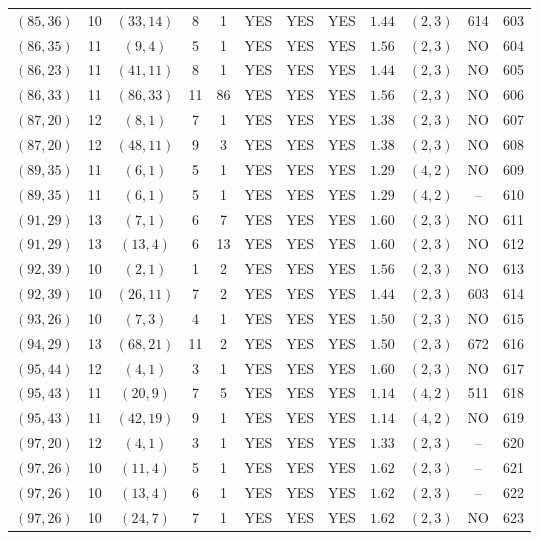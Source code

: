 \begin{longtable}{|c|c|c|c|c|c|c|c|c|c|c|c|}
$(85,36)$ & 10 & $(33,14)$ & 8 & 1 & YES & YES & YES & $1.44$ & $(2,3)$ & 614 & 603\\
$(86,35)$ & 11 & $(9,4)$ & 5 & 1 & YES & YES & YES & $1.56$ & $(2,3)$ & NO & 604\\
$(86,23)$ & 11 & $(41,11)$ & 8 & 1 & YES & YES & YES & $1.44$ & $(2,3)$ & NO & 605\\
$(86,33)$ & 11 & $(86,33)$ & 11 & 86 & YES & YES & YES & $1.56$ & $(2,3)$ & NO & 606\\
$(87,20)$ & 12 & $(8,1)$ & 7 & 1 & YES & YES & YES & $1.38$ & $(2,3)$ & NO & 607\\
$(87,20)$ & 12 & $(48,11)$ & 9 & 3 & YES & YES & YES & $1.38$ & $(2,3)$ & NO & 608\\
$(89,35)$ & 11 & $(6,1)$ & 5 & 1 & YES & YES & YES & $1.29$ & $(4,2)$ & NO & 609\\
$(89,35)$ & 11 & $(6,1)$ & 5 & 1 & YES & YES & YES & $1.29$ & $(4,2)$ & -- & 610\\
$(91,29)$ & 13 & $(7,1)$ & 6 & 7 & YES & YES & YES & $1.60$ & $(2,3)$ & NO & 611\\
$(91,29)$ & 13 & $(13,4)$ & 6 & 13 & YES & YES & YES & $1.60$ & $(2,3)$ & NO & 612\\
$(92,39)$ & 10 & $(2,1)$ & 1 & 2 & YES & YES & YES & $1.56$ & $(2,3)$ & NO & 613\\
$(92,39)$ & 10 & $(26,11)$ & 7 & 2 & YES & YES & YES & $1.44$ & $(2,3)$ & 603 & 614\\
$(93,26)$ & 10 & $(7,3)$ & 4 & 1 & YES & YES & YES & $1.50$ & $(2,3)$ & NO & 615\\
$(94,29)$ & 13 & $(68,21)$ & 11 & 2 & YES & YES & YES & $1.50$ & $(2,3)$ & 672 & 616\\
$(95,44)$ & 12 & $(4,1)$ & 3 & 1 & YES & YES & YES & $1.60$ & $(2,3)$ & NO & 617\\
$(95,43)$ & 11 & $(20,9)$ & 7 & 5 & YES & YES & YES & $1.14$ & $(4,2)$ & 511 & 618\\
$(95,43)$ & 11 & $(42,19)$ & 9 & 1 & YES & YES & YES & $1.14$ & $(4,2)$ & NO & 619\\
$(97,20)$ & 12 & $(4,1)$ & 3 & 1 & YES & YES & YES & $1.33$ & $(2,3)$ & -- & 620\\
$(97,26)$ & 10 & $(11,4)$ & 5 & 1 & YES & YES & YES & $1.62$ & $(2,3)$ & -- & 621\\
$(97,26)$ & 10 & $(13,4)$ & 6 & 1 & YES & YES & YES & $1.62$ & $(2,3)$ & -- & 622\\
$(97,26)$ & 10 & $(24,7)$ & 7 & 1 & YES & YES & YES & $1.62$ & $(2,3)$ & NO & 623\\

\end{longtable}
